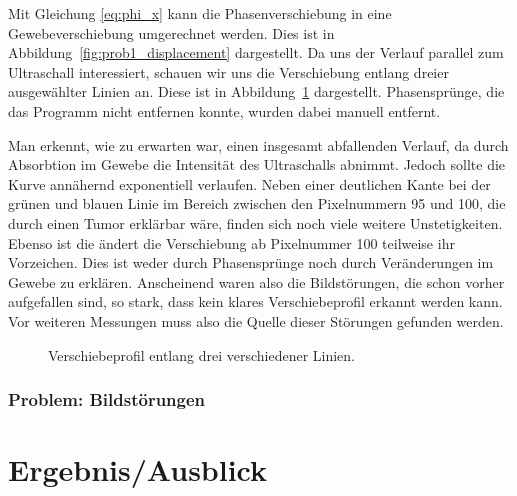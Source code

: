 \documentclass[
    11pt,
    ngerman
]{scrreprt}
\begin{document}
Mit Gleichung \ref{eq:phi_x} kann die Phasenverschiebung in eine
Gewebeverschiebung umgerechnet werden. Dies ist in
Abbildung~\ref{fig:prob1_displacement} dargestellt. Da uns der Verlauf parallel
zum Ultraschall interessiert, schauen wir uns die Verschiebung entlang dreier
ausgewählter Linien an. Diese ist in Abbildung~\ref{fig:verschiebeprofil}
dargestellt.  Phasensprünge, die das Programm nicht entfernen konnte, wurden
dabei manuell entfernt. 

Man erkennt, wie zu erwarten war, einen insgesamt abfallenden Verlauf, da durch
Absorbtion im Gewebe die Intensität des Ultraschalls abnimmt. Jedoch sollte die
Kurve annähernd exponentiell verlaufen. Neben einer deutlichen Kante bei der
grünen und blauen Linie im Bereich zwischen den Pixelnummern 95 und 100, die
durch einen Tumor erklärbar wäre, finden sich noch viele weitere
Unstetigkeiten. Ebenso ist die ändert die Verschiebung ab Pixelnummer 100
teilweise ihr Vorzeichen. Dies ist weder durch Phasensprünge noch durch
Veränderungen im Gewebe zu erklären. Anscheinend waren also die Bildstörungen,
die schon vorher aufgefallen sind, so stark, dass kein klares Verschiebeprofil
erkannt werden kann. Vor weiteren Messungen muss also die Quelle dieser
Störungen gefunden werden.

\begin{figure}
    \centering
    \caption{%
        Verschiebeprofil entlang drei verschiedener Linien.
    }
    \label{fig:verschiebeprofil}
\end{figure}

\subsection{Problem: Bildstörungen}

\chapter{Ergebnis/Ausblick}
\end{document}
